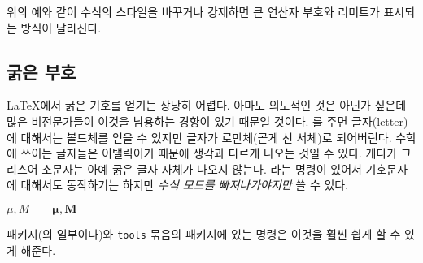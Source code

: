 \noindent 위의 예와 같이 수식의 스타일을 바꾸거나 강제하면 큰 연산자 부호와 리미트가 표시되는 방식이 달라진다.



\subsection{굵은 부호}

\LaTeX 에서 굵은 기호를 얻기는 상당히 어렵다. 아마도 의도적인 것은 아닌가 싶은데 많은 비전문가들이 이것을 남용하는 경향이 있기 때문일 것이다.
를 주면 글자(letter)에 대해서는 볼드체를 얻을 수 있지만 
글자가 로만체(곧게 선 서체)로 되어버린다. 수학에 쓰이는 글자들은 이탤릭이기 때문에 
생각과 다르게 나오는 것일 수 있다. 게다가 그리스어 소문자는 아예 굵은 글자 자체가 나오지 않는다.
라는 명령이 있어서 기호문자에 대해서도 동작하기는 하지만
\emph{수식 모드를 빠져나가야지만} 쓸 수 있다.
\begin{example}
$\mu, M \qquad 
\mathbf{\mu}, \mathbf{M}$
\qquad {}
\end{example}

 패키지(의 일부이다)와 \texttt{tools} 묶음의 
 패키지에 있는  명령은 이것을 훨씬 쉽게 할 수 있게 해준다.

